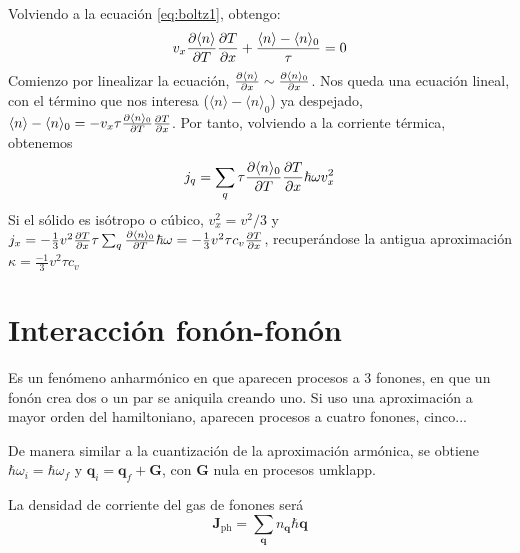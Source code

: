 Volviendo a la ecuación \ref{eq:boltz1}, obtengo:
\begin{equation}
  v_x  \frac{\partial \langle n \rangle}{\partial T} \frac{\partial T}{\partial x} + \frac{\langle n
    \rangle - \langle n \rangle_0}{\tau} = 0
\end{equation}
Comienzo por linealizar la ecuación,
$\frac{\partial \langle n \rangle}{\partial x} \sim \frac{\partial \langle n
  \rangle_0}{\partial x}$.
Nos queda una ecuación lineal, con el término que nos interesa
($\langle n \rangle - \langle n \rangle_0$) ya despejado,
$ \langle n \rangle - \langle n \rangle_0 = - v_x \tau \frac{\partial \langle
  n \rangle_0}{\partial T} \frac{\partial T}{\partial x} $.
Por tanto, volviendo a la corriente térmica, obtenemos
\begin{equation}
  j_q = \sum_{q} \tau \frac{\partial \langle n \rangle_0}{\partial T} \frac{\partial T}{\partial x}
  \hbar \omega v_x^2
\end{equation}
Si el sólido es isótropo o cúbico, $v_x^2 = v^2 / 3$ y
$j_x = - \frac{1}{3} v^2 \frac{\partial T}{\partial x} \tau \sum_{q} \frac{\partial \langle n
  \rangle_0}{\partial T}\hbar \omega = - \frac{1}{3} v^2 \tau c_v \frac{\partial T}{\partial x}
$, recuperándose la antigua aproximación $\kappa = \frac{-1}{3}v^2
\tau c_v$

\section{Interacción fonón-fonón}
Es un fenómeno anharmónico en que aparecen procesos a 3 fonones, en
que un fonón crea dos o un par se aniquila creando uno. Si uso una
aproximación a mayor orden del hamiltoniano, aparecen procesos a
cuatro fonones, cinco...

De manera similar a la cuantización de la aproximación armónica, se
obtiene $\hbar \omega_i = \hbar \omega_f$ y $\mathbf{q}_i =
\mathbf{q}_f + \mathbf{G}$, con $\mathbf{G}$ nula en procesos umklapp.


La densidad de corriente del gas de fonones será
\begin{equation}
  \mathbf{J}_\text{ph} = \sum_{\mathbf{q}} n_\mathbf{q} \hbar \mathbf{q}
\end{equation}

